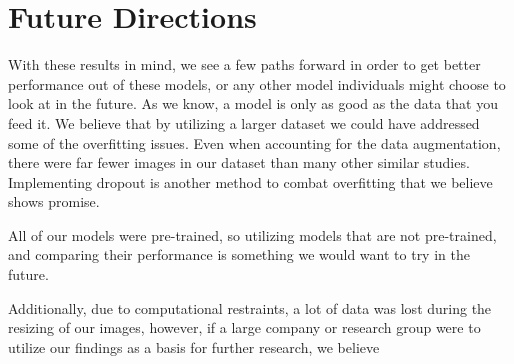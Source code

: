\documentclass{article}
\begin{document}
\section{Future Directions}

With these results in mind, we see a few paths forward in order to get better performance out of these models, or any other model individuals might choose to look at in the future.
As we know, a model is only as good as the data that you feed it. We believe that by utilizing a larger dataset we could have addressed some of the overfitting issues. Even when accounting for the data augmentation, there were far fewer images in our dataset than many other similar studies. Implementing dropout is another method to combat overfitting that we believe shows promise.

All of our models were pre-trained, so utilizing models that are not pre-trained, and comparing their performance is something we would want to try in the future.

Additionally, due to computational restraints, a lot of data was lost during the resizing of our images, however, if a large company or research group were to utilize our findings as a basis for further research, we believe

\nocite{Dosovitskiy}
\nocite{He}
\nocite{Wu}
\nocite{cvt}
\nocite{vit}
\nocite{resnet}
\printbibliography
\end{document}
